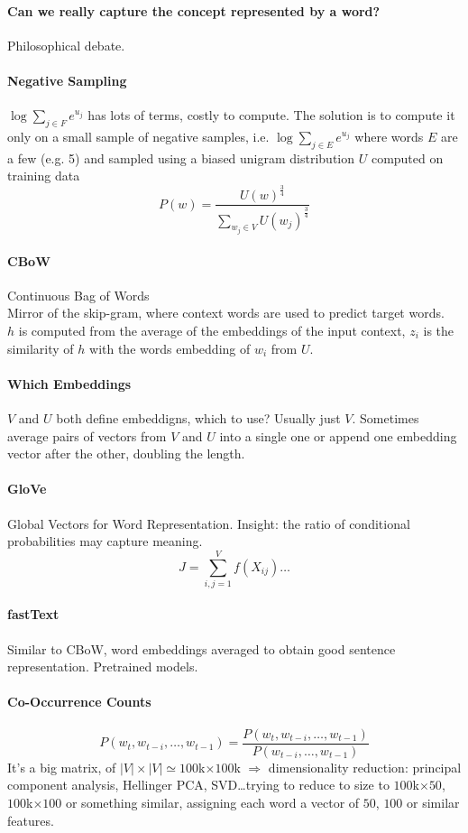 \documentclass[10pt]{report}
\begin{document}
\paragraph{Can we really capture the concept represented by a word?} Philosophical debate.
\paragraph{Negative Sampling} $\log\sum_{j\in F}e^{u_j}$ has lots of terms, costly to compute. The solution is to compute it only on a small sample of negative samples, i.e. $\log\sum_{j\in E}e^{u_j}$ where words $E$ are a few (e.g. 5) and sampled using a biased unigram distribution $U$ computed on training data
$$P(w) = \frac{U(w)^{\frac{3}{4}}}{\sum_{w_j\in V}U(w_j)^{\frac{3}{4}}}$$
\paragraph{CBoW} Continuous Bag of Words\\
Mirror of the skip-gram, where context words are used to predict target words.\\
$h$ is computed from the average of the embeddings of the input context, $z_i$ is the similarity of $h$ with the words embedding of $w_i$ from $U$.
\paragraph{Which Embeddings} $V$ and $U$ both define embeddigns, which to use? Usually just $V$. Sometimes average pairs of vectors from $V$ and $U$ into a single one or append one embedding vector after the other, doubling the length.
\paragraph{GloVe} Global Vectors for Word Representation. Insight: the ratio of conditional probabilities may capture meaning.
$$J = \sum_{i,j=1}^V f(X_{ij})\ldots$$
\paragraph{fastText} Similar to CBoW, word embeddings averaged to obtain good sentence representation. Pretrained models.
\paragraph{Co-Occurrence Counts}
$$P(w_t,w_{t-i},\ldots,w_{t-1}) = \frac{P(w_t,w_{t-i},\ldots,w_{t-1})}{P(w_{t-i},\ldots,w_{t-1})}$$
It's a big matrix, of $|V|\times|V|\simeq 100$k$\times100$k $\Rightarrow$ dimensionality reduction: principal component analysis, Hellinger PCA, SVD\ldots trying to reduce to size to $100$k$\times 50$, $100$k$\times 100$ or something similar, assigning each word a vector of $50$, $100$ or similar features.
\end{document}
